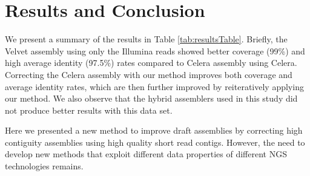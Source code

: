 \documentclass[12pt]{article}
\begin{document}
\section{Results and Conclusion}
\label{res}
We present a summary of the results in Table \ref{tab:resultsTable}. Briefly, the Velvet assembly using only the Illumina reads showed better coverage (99\%) and high average identity  (97.5\%) rates compared to Celera assembly using Celera. Correcting the Celera assembly with our method improves both coverage and average identity rates, which are then further improved by reiteratively applying our method. We also observe that the hybrid assemblers used in this study did not produce better results with this data set.


 Here we presented a new method to improve draft assemblies by correcting high contiguity assemblies using high quality short read contigs. However, the need to develop new methods that exploit
 different data properties of different NGS technologies remains.
       
\end{document}
